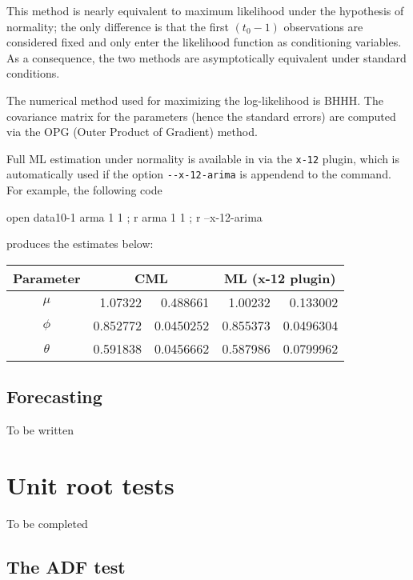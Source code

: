 This method is nearly equivalent to maximum likelihood under the
hypothesis of normality; the only difference is that the first $(t_0 -
1)$ observations are considered fixed and only enter the likelihood
function as conditioning variables. As a consequence, the two methods
are asymptotically equivalent under standard conditions.

The numerical method used for maximizing the log-likelihood is BHHH.
The covariance matrix for the parameters (hence the standard errors)
are computed via the OPG (Outer Product of Gradient) method.

Full ML estimation under normality is available in  via
the \verb|x-12| plugin, which is automatically used if the option
\verb|--x-12-arima| is appendend to the  command. For
example, the following code
\begin{code}
  open data10-1
  arma 1 1 ; r
  arma 1 1 ; r --x-12-arima
\end{code}
produces the estimates below:
\begin{center}
  \begin{tabular}{crrrr}
    \hline
    Parameter & \multicolumn{2}{c}{\textrm{CML}} &
    \multicolumn{2}{c}{\textrm{ML (x-12 plugin)}} \\
    \hline 
    $\mu$ & 1.07322 & 0.488661 &  1.00232 & 0.133002 \\
    $\phi$ & 0.852772 & 0.0450252 & 0.855373  & 0.0496304 \\
    $\theta$ & 0.591838 & 0.0456662 & 0.587986 & 0.0799962 \\
    \hline
  \end{tabular}
\end{center}

\subsection{Forecasting}
\label{arma-fcast}

To be written

\section{Unit root tests}
\label{sec:uroot}

To be completed

\subsection{The ADF test}
\label{sec:ADFtest}

